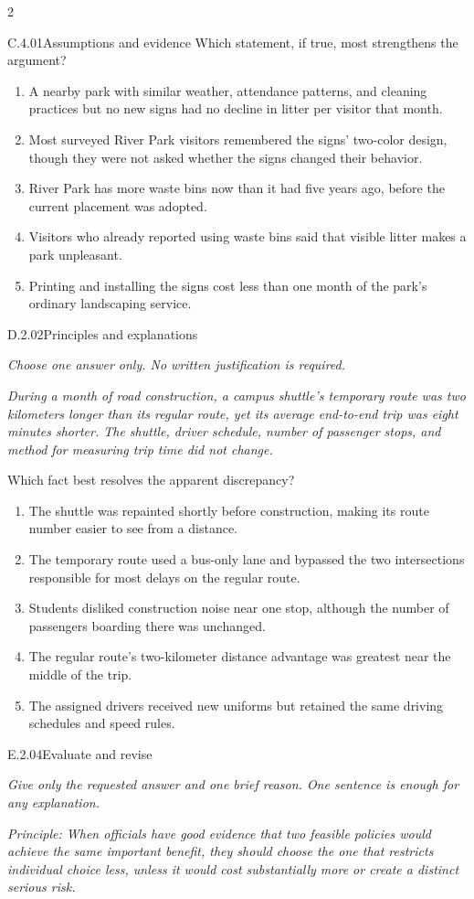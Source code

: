 \documentclass[9pt]{extarticle}
\newcommand{\choice}[1]{\item #1}
\begin{document}
\begin{multicols}{2}
\begin{DenseCoreProblem}{C.4.01}{Assumptions and evidence}
Which statement, if true, most strengthens the argument?
\begin{enumerate}[label=(\alph*)]
  \choice{A nearby park with similar weather, attendance patterns, and cleaning practices but no new signs had no decline in litter per visitor that month.}
  \choice{Most surveyed River Park visitors remembered the signs' two-color design, though they were not asked whether the signs changed their behavior.}
  \choice{River Park has more waste bins now than it had five years ago, before the current placement was adopted.}
  \choice{Visitors who already reported using waste bins said that visible litter makes a park unpleasant.}
  \choice{Printing and installing the signs cost less than one month of the park's ordinary landscaping service.}
\end{enumerate}
\end{DenseCoreProblem}
\begin{DenseCoreProblem}{D.2.02}{Principles and explanations}
{\scriptsize\textit{Choose one answer only. No written justification is required.}\par}
\emph{During a month of road construction, a campus shuttle's temporary route was two kilometers longer than its regular route, yet its average end-to-end trip was eight minutes shorter. The shuttle, driver schedule, number of passenger stops, and method for measuring trip time did not change.}

Which fact best resolves the apparent discrepancy?
\begin{enumerate}[label=(\alph*)]
  \choice{The shuttle was repainted shortly before construction, making its route number easier to see from a distance.}
  \choice{The temporary route used a bus-only lane and bypassed the two intersections responsible for most delays on the regular route.}
  \choice{Students disliked construction noise near one stop, although the number of passengers boarding there was unchanged.}
  \choice{The regular route's two-kilometer distance advantage was greatest near the middle of the trip.}
  \choice{The assigned drivers received new uniforms but retained the same driving schedules and speed rules.}
\end{enumerate}
\end{DenseCoreProblem}
\begin{DenseCoreProblem}{E.2.04}{Evaluate and revise}
{\scriptsize\textit{Give only the requested answer and one brief reason. One sentence is enough for any explanation.}\par}
\emph{Principle: When officials have good evidence that two feasible policies would achieve the same important benefit, they should choose the one that restricts individual choice less, unless it would cost substantially more or create a distinct serious risk.}


\end{DenseCoreProblem}
\end{multicols}
\end{document}
